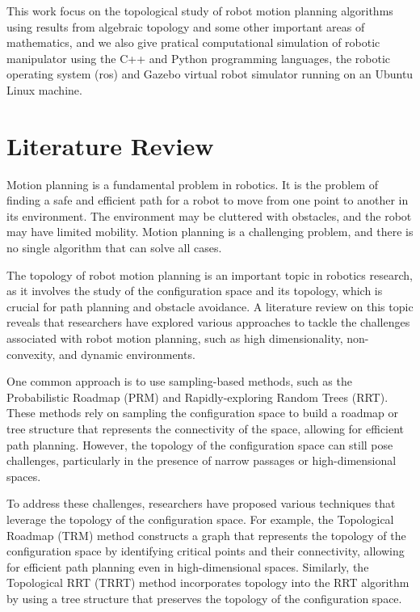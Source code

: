This work focus on the topological study of robot motion planning algorithms using results from algebraic topology and some other important areas of mathematics, and we also give pratical computational simulation of robotic manipulator using the C++ and Python programming languages, the robotic operating system (ros) and Gazebo virtual robot simulator running on an Ubuntu Linux machine.

\section{Literature Review}
Motion planning is a fundamental problem in robotics. It is the problem of finding a safe and efficient path for a robot to move from one point to another in its environment. The environment may be cluttered with obstacles, and the robot may have limited mobility. Motion planning is a challenging problem, and there is no single algorithm that can solve all cases.

The topology of robot motion planning is an important topic in robotics research, as it involves the study of the configuration space and its topology, which is crucial for path planning and obstacle avoidance. A literature review on this topic reveals that researchers have explored various approaches to tackle the challenges associated with robot motion planning, such as high dimensionality, non-convexity, and dynamic environments.

One common approach is to use sampling-based methods, such as the Probabilistic Roadmap (PRM) and Rapidly-exploring Random Trees (RRT). These methods rely on sampling the configuration space to build a roadmap or tree structure that represents the connectivity of the space, allowing for efficient path planning. However, the topology of the configuration space can still pose challenges, particularly in the presence of narrow passages or high-dimensional spaces.

To address these challenges, researchers have proposed various techniques that leverage the topology of the configuration space. For example, the Topological Roadmap (TRM) method constructs a graph that represents the topology of the configuration space by identifying critical points and their connectivity, allowing for efficient path planning even in high-dimensional spaces. Similarly, the Topological RRT (TRRT) method incorporates topology into the RRT algorithm by using a tree structure that preserves the topology of the configuration space.

